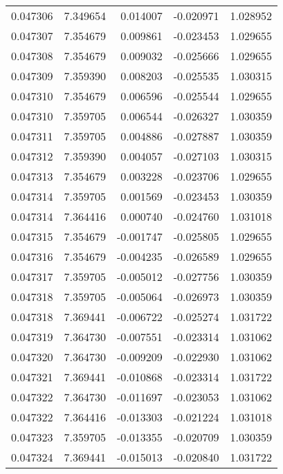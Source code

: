 \begin{tabular}{lrrrr}
0.047306    &  7.349654 &  0.014007 & -0.020971 &             1.028952 \\
0.047307    &  7.354679 &  0.009861 & -0.023453 &             1.029655 \\
0.047308    &  7.354679 &  0.009032 & -0.025666 &             1.029655 \\
0.047309    &  7.359390 &  0.008203 & -0.025535 &             1.030315 \\
0.047310    &  7.354679 &  0.006596 & -0.025544 &             1.029655 \\
0.047310    &  7.359705 &  0.006544 & -0.026327 &             1.030359 \\
0.047311    &  7.359705 &  0.004886 & -0.027887 &             1.030359 \\
0.047312    &  7.359390 &  0.004057 & -0.027103 &             1.030315 \\
0.047313    &  7.354679 &  0.003228 & -0.023706 &             1.029655 \\
0.047314    &  7.359705 &  0.001569 & -0.023453 &             1.030359 \\
0.047314    &  7.364416 &  0.000740 & -0.024760 &             1.031018 \\
0.047315    &  7.354679 & -0.001747 & -0.025805 &             1.029655 \\
0.047316    &  7.354679 & -0.004235 & -0.026589 &             1.029655 \\
0.047317    &  7.359705 & -0.005012 & -0.027756 &             1.030359 \\
0.047318    &  7.359705 & -0.005064 & -0.026973 &             1.030359 \\
0.047318    &  7.369441 & -0.006722 & -0.025274 &             1.031722 \\
0.047319    &  7.364730 & -0.007551 & -0.023314 &             1.031062 \\
0.047320    &  7.364730 & -0.009209 & -0.022930 &             1.031062 \\
0.047321    &  7.369441 & -0.010868 & -0.023314 &             1.031722 \\
0.047322    &  7.364730 & -0.011697 & -0.023053 &             1.031062 \\
0.047322    &  7.364416 & -0.013303 & -0.021224 &             1.031018 \\
0.047323    &  7.359705 & -0.013355 & -0.020709 &             1.030359 \\
0.047324    &  7.369441 & -0.015013 & -0.020840 &             1.031722 \\

\end{tabular}
